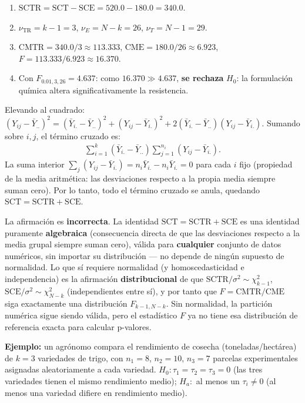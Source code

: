 \begin{solproblema}[prob:2b1379c]
	\begin{enumerate}
		\item $\text{SCTR}=\text{SCT}-\text{SCE}=520.0-180.0=340.0$.
		\item $\nu_{\text{TR}}=k-1=3$, $\nu_E=N-k=26$, $\nu_T=N-1=29$.
		\item $\text{CMTR}=340.0/3\approx113.333$, $\text{CME}=180.0/26\approx6.923$, $F=113.333/6.923\approx16.370$.
		\item Con $F_{0.01,3,26}=4.637$: como $16.370\gg4.637$, \textbf{se rechaza} $H_0$: la formulación química altera significativamente la resistencia.
	\end{enumerate}
\end{solproblema}

\begin{solproblema}[prob:614e799]
	Elevando al cuadrado: $(Y_{ij}-\bar Y_{..})^2 = (\bar Y_{i.}-\bar Y_{..})^2+(Y_{ij}-\bar Y_{i.})^2+2(\bar Y_{i.}-\bar Y_{..})(Y_{ij}-\bar Y_{i.})$. Sumando sobre $i,j$, el término cruzado es:
	\begin{align*}
		\sum_{i=1}^k(\bar Y_{i.}-\bar Y_{..})\sum_{j=1}^{n_i}(Y_{ij}-\bar Y_{i.}).
	\end{align*}
	La suma interior $\sum_j(Y_{ij}-\bar Y_{i.}) = n_i\bar Y_{i.}-n_i\bar Y_{i.}=0$ para cada $i$ fijo (propiedad de la media aritmética: las desviaciones respecto a la propia media siempre suman cero). Por lo tanto, todo el término cruzado se anula, quedando $\text{SCT}=\text{SCTR}+\text{SCE}$.
\end{solproblema}

\begin{solproblema}[prob:792b2ff]
	La afirmación es \textbf{incorrecta}. La identidad $\text{SCT}=\text{SCTR}+\text{SCE}$ es una identidad puramente \textbf{algebraica} (consecuencia directa de que las desviaciones respecto a la media grupal siempre suman cero), válida para \textbf{cualquier} conjunto de datos numéricos, sin importar su distribución — no depende de ningún supuesto de normalidad. Lo que sí requiere normalidad (y homoscedasticidad e independencia) es la afirmación \textbf{distribucional} de que $\text{SCTR}/\sigma^2\sim\chi^2_{k-1}$, $\text{SCE}/\sigma^2\sim\chi^2_{N-k}$ (independientes entre sí), y por tanto que $F=\text{CMTR}/\text{CME}$ siga exactamente una distribución $F_{k-1,N-k}$. Sin normalidad, la partición numérica sigue siendo válida, pero el estadístico $F$ ya no tiene esa distribución de referencia exacta para calcular p-valores.
\end{solproblema}

\begin{solproblema}[prob:4e06b95]
	\textbf{Ejemplo:} un agrónomo compara el rendimiento de cosecha (toneladas/hectárea) de $k=3$ variedades de trigo, con $n_1=8$, $n_2=10$, $n_3=7$ parcelas experimentales asignadas aleatoriamente a cada variedad. $H_0: \tau_1=\tau_2=\tau_3=0$ (las tres variedades tienen el mismo rendimiento medio); $H_a:$ al menos un $\tau_i\neq0$ (al menos una variedad difiere en rendimiento medio).
\end{solproblema}
